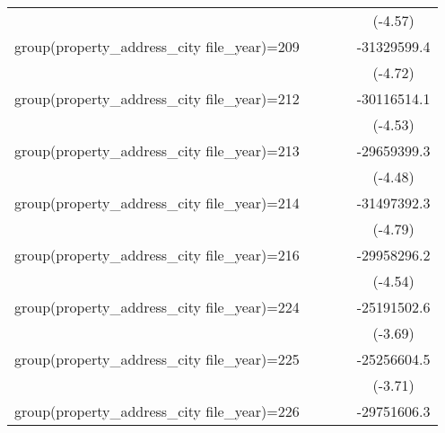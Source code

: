 {\begin{tabular}{l*{4}{c}}
                    &                     &                     &                     &     (-4.57)         \\
\addlinespace
group(property\_address\_city file\_year)=209&                     &                     &                     & -31329599.4\sym{***}\\
                    &                     &                     &                     &     (-4.72)         \\
\addlinespace
group(property\_address\_city file\_year)=212&                     &                     &                     & -30116514.1\sym{***}\\
                    &                     &                     &                     &     (-4.53)         \\
\addlinespace
group(property\_address\_city file\_year)=213&                     &                     &                     & -29659399.3\sym{***}\\
                    &                     &                     &                     &     (-4.48)         \\
\addlinespace
group(property\_address\_city file\_year)=214&                     &                     &                     & -31497392.3\sym{***}\\
                    &                     &                     &                     &     (-4.79)         \\
\addlinespace
group(property\_address\_city file\_year)=216&                     &                     &                     & -29958296.2\sym{***}\\
                    &                     &                     &                     &     (-4.54)         \\
\addlinespace
group(property\_address\_city file\_year)=224&                     &                     &                     & -25191502.6\sym{***}\\
                    &                     &                     &                     &     (-3.69)         \\
\addlinespace
group(property\_address\_city file\_year)=225&                     &                     &                     & -25256604.5\sym{***}\\
                    &                     &                     &                     &     (-3.71)         \\
\addlinespace
group(property\_address\_city file\_year)=226&                     &                     &                     & -29751606.3\sym{***}\\

\end{tabular}}

